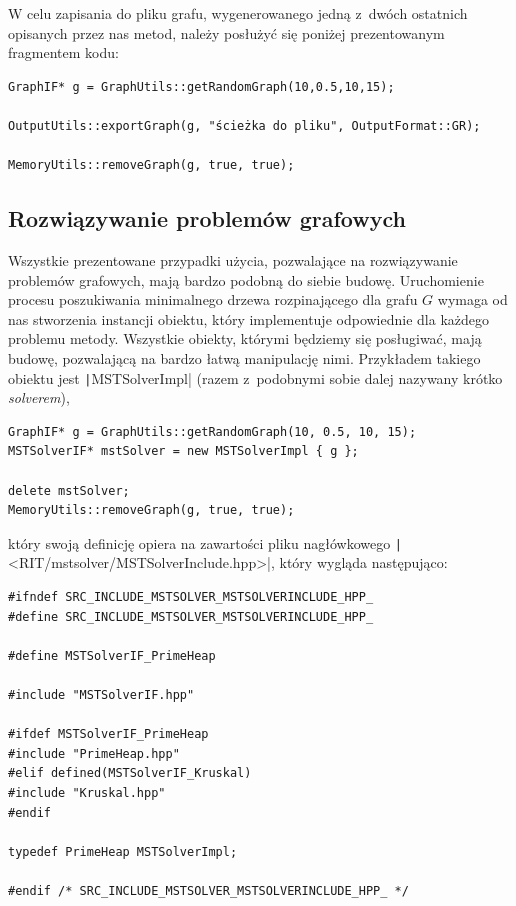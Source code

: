 W celu zapisania do pliku grafu, wygenerowanego jedną z~dwóch ostatnich opisanych przez nas metod, należy posłużyć się poniżej prezentowanym fragmentem kodu:

\begin{verbatim}
GraphIF* g = GraphUtils::getRandomGraph(10,0.5,10,15);

OutputUtils::exportGraph(g, "ścieżka do pliku", OutputFormat::GR);

MemoryUtils::removeGraph(g, true, true);
\end{verbatim}


\subsection{Rozwiązywanie problemów grafowych}


Wszystkie prezentowane przypadki użycia, pozwalające na rozwiązywanie problemów grafowych, mają bardzo podobną do siebie budowę. 
Uruchomienie procesu poszukiwania minimalnego drzewa rozpinającego dla grafu $G$ wymaga od nas stworzenia instancji obiektu, który implementuje odpowiednie dla każdego problemu metody.
Wszystkie obiekty, którymi będziemy się posługiwać, mają budowę, pozwalającą na bardzo łatwą manipulację nimi.
Przykładem takiego obiektu jest \texttt|MSTSolverImpl| (razem z~podobnymi sobie dalej nazywany krótko \textit{solverem}),

\begin{verbatim}
GraphIF* g = GraphUtils::getRandomGraph(10, 0.5, 10, 15);
MSTSolverIF* mstSolver = new MSTSolverImpl { g };

delete mstSolver;
MemoryUtils::removeGraph(g, true, true);
\end{verbatim}
który swoją definicję opiera na zawartości pliku nagłówkowego \texttt|<RIT/mstsolver/MSTSolverInclude.hpp>|, który wygląda następująco: 

\begin{verbatim}
#ifndef SRC_INCLUDE_MSTSOLVER_MSTSOLVERINCLUDE_HPP_
#define SRC_INCLUDE_MSTSOLVER_MSTSOLVERINCLUDE_HPP_

#define MSTSolverIF_PrimeHeap

#include "MSTSolverIF.hpp"

#ifdef MSTSolverIF_PrimeHeap
#include "PrimeHeap.hpp"
#elif defined(MSTSolverIF_Kruskal)
#include "Kruskal.hpp"
#endif

typedef PrimeHeap MSTSolverImpl;

#endif /* SRC_INCLUDE_MSTSOLVER_MSTSOLVERINCLUDE_HPP_ */
\end{verbatim}

